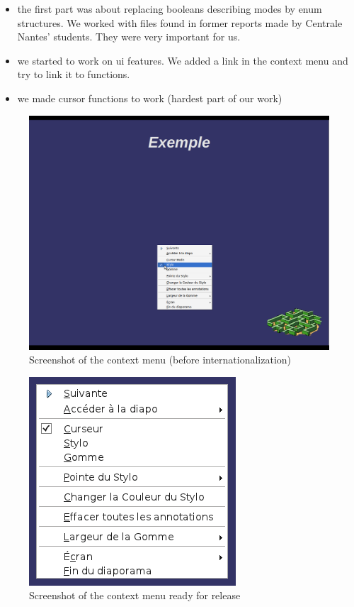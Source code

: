 \documentclass[a4paper,11pt]{article}
\begin{document}
\begin{itemize}
\item the first part was about replacing booleans describing modes by enum structures. We worked with files found in former reports made by Centrale Nantes' students. They were very important for us.
\item we started to work on ui features. We added a link in the context menu and try to link it to functions.
\item we made cursor functions to work (hardest part of our work)
\end{itemize}

\begin{figure}[!h]
\centering
\includegraphics[scale=0.3]{images/screenshot_020.png}
\caption{Screenshot of the context menu (before internationalization)}
\end{figure}

\begin{figure}[!h]
\centering
\includegraphics[scale=0.5]{images/Context_menu.png}
\caption{Screenshot of the context menu ready for release}
\end{figure}
\end{document}
